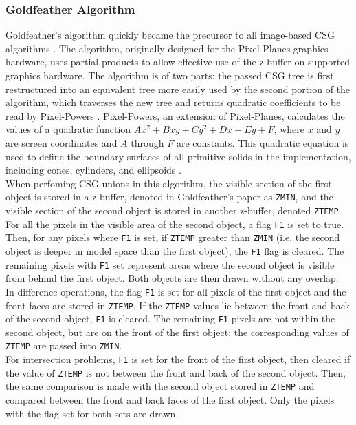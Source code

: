 \documentclass[12pt]{article}
\begin{document}
\begin{doublespace}
\subsubsection{Goldfeather Algorithm}
Goldfeather's algorithm quickly became the precursor to all image-based CSG algorithms \cite{hardware_csg}. The algorithm, originally designed for the Pixel-Planes graphics hardware, uses partial products to allow effective use of the z-buffer on supported graphics hardware. The algorithm is of two parts: the passed CSG tree is first restructured into an equivalent tree more easily used by the second portion of the algorithm, which traverses the new tree and returns quadratic coefficients to be read by Pixel-Powers \cite{gold}. Pixel-Powers, an extension of Pixel-Planes, calculates the values of a quadratic function $Ax^2 + Bxy + Cy^2 + Dx + Ey + F$, where $x$ and $y$ are screen coordinates and $A$ through $F$ are constants. This quadratic equation is used to define the boundary surfaces of all primitive solids in the implementation, including cones, cylinders, and ellipsoids \cite{gold}.\\

When perfoming CSG unions in this algorithm, the visible section of the first object is stored in a z-buffer, denoted in Goldfeather's paper as \texttt{ZMIN}, and the visible section of the second object is stored in another z-buffer, denoted \texttt{ZTEMP}. For all the pixels in the visible area of the second object, a flag \texttt{F1} is set to true. Then, for any pixels where \texttt{F1} is set, if \texttt{ZTEMP} greater than \texttt{ZMIN} (i.e. the second object is deeper in model space than the first object), the \texttt{F1} flag is cleared. The remaining pixels with \texttt{F1} set represent areas where the second object is visible from behind the first object. Both objects are then drawn without any overlap.\\

In difference operations, the flag \texttt{F1} is set for all pixels of the first object and the front faces are stored in \texttt{ZTEMP}. If the \texttt{ZTEMP} values lie between the front and back of the second object, \texttt{F1} is cleared. The remaining \texttt{F1} pixels are not within the second object, but are on the front of the first object; the corresponding values of \texttt{ZTEMP} are passed into \texttt{ZMIN}.\\

For intersection problems, \texttt{F1} is set for the front of the first object, then cleared if the value of \texttt{ZTEMP} is not between the front and back of the second object. Then, the same comparison is made with the second object stored in \texttt{ZTEMP} and compared between the front and back faces of the first object. Only the pixels with the flag set for both sets are drawn.

\end{doublespace}
\end{document}
